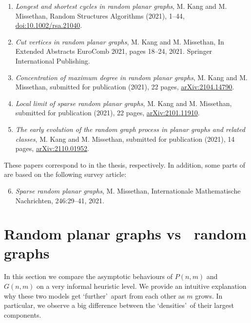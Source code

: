 \begin{enumerate}
    \item 
    \textit{Longest and shortest cycles in random planar graphs}, M. Kang and M. Missethan, Random Structures Algorithms (2021), 1--44,  \href{https://onlinelibrary.wiley.com/doi/full/10.1002/rsa.21040}{doi:10.1002/rsa.21040}.
    \item
    \textit{Cut vertices in random planar graphs}, M. Kang and M. Missethan, In Extended Abstracts EuroComb 2021, pages 18--24, 2021. Springer International Publishing.
    \item
    \textit{Concentration of maximum degree in random planar graphs}, M. Kang and M. Missethan, submitted for publication (2021), 22 pages, \href{https://arxiv.org/abs/2104.14790}{arXiv:2104.14790}.
    \item
    \textit{Local limit of sparse random planar graphs}, M. Kang and M. Missethan, submitted for publication (2021), 22 pages, \href{https://arxiv.org/abs/2101.11910}{arXiv:2101.11910}.
    \item
    \textit{The early evolution of the random graph process in planar graphs and related classes}, M. Kang and M. Missethan, submitted for publication (2021), 14 pages, \href{https://arxiv.org/abs/2110.01952}{arXiv:2110.01952}.
\end{enumerate}

These papers correspond to  in the thesis, respectively. In addition, some parts of  are based on the following survey article:
\begin{enumerate}
\setcounter{enumi}{5}
\item
\textit{Sparse random planar graphs}, M. Missethan, Internationale Mathematische
\newline
Nachrichten, 246:29--41, 2021.
\end{enumerate}

\section{Random planar graphs vs \ER\ random graphs}\label{sec:planar_vs_erdoes}
In this section we compare the asymptotic behaviours of $P(n,m)$ and $G(n,m)$ on a very informal heuristic level. We provide an intuitive explanation why these two models get \lq further\rq\ apart from each other as $m$ grows. In particular, we observe a big difference between the \lq densities\rq\ of their largest components.

